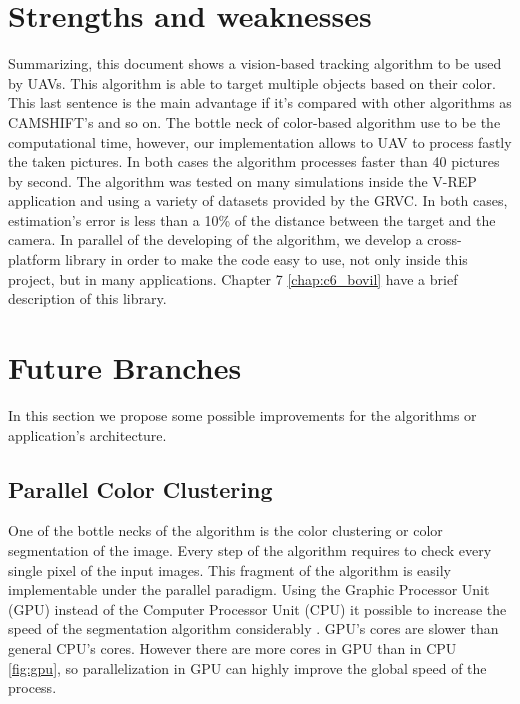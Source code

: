 \section{Strengths and weaknesses}
	Summarizing, this document shows a vision-based tracking algorithm to be used by UAVs. This algorithm is able to target multiple objects based on their color. This last sentence is the main advantage if it's compared with other algorithms as CAMSHIFT's \cite{CAMSHIFT_FAST} \cite{CAMSHIFT_ENVIROMENT}  and so on. The bottle neck of color-based algorithm use to be the computational time, however, our implementation allows to UAV to process fastly the taken pictures. In both cases the algorithm processes faster than 40 pictures by second.
	The algorithm was tested on many simulations inside the V-REP application and using a variety of datasets provided by the GRVC. In both cases, estimation's error is less than a 10\% of the distance between the target and the camera.
	In parallel of the developing of the algorithm, we develop a cross-platform library in order to make the code easy to use, not only inside this project, but in many applications. Chapter 7 \ref{chap:c6_bovil} have a brief description of this library.
	
	
\section{Future Branches}
	In this section we propose some possible improvements for the algorithms or application's architecture.
	
	\subsection{Parallel Color Clustering}
	One of the bottle necks of the algorithm is the color clustering or color segmentation of the image. Every step of the algorithm requires to check every single pixel of the input images. This fragment of the algorithm is easily implementable under the parallel paradigm. Using the Graphic Processor Unit (GPU) instead of the Computer Processor Unit (CPU) it possible to increase the speed of the segmentation algorithm considerably \cite{GPU_CPU_performance} \cite{GPU_parallel_image_processing} \cite{GPU_enabled_parrallel}.
	GPU's cores are slower than general CPU's cores. However there are more cores in GPU than in CPU \ref{fig:gpu}, so parallelization in GPU can highly improve the global speed of the process.
		
